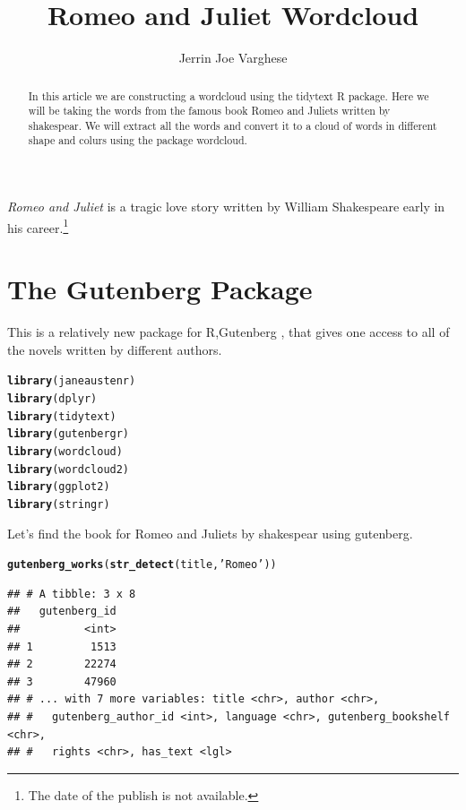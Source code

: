 \documentclass{article}\usepackage[]{graphicx}\usepackage[]{color}
\makeatletter
\newcommand{\hlstr}[1]{\textcolor[rgb]{0.192,0.494,0.8}{#1}}%
\newcommand{\hlstd}[1]{\textcolor[rgb]{0.345,0.345,0.345}{#1}}%
\newcommand{\hlkwd}[1]{\textcolor[rgb]{0.737,0.353,0.396}{\textbf{#1}}}%
\newenvironment{kframe}{%
 \def\at@end@of@kframe{}%
 \ifinner\ifhmode%
  \def\at@end@of@kframe{\end{minipage}}%
  \begin{minipage}{\columnwidth}%
 \fi\fi%
 \def\FrameCommand##1{\hskip\@totalleftmargin \hskip-\fboxsep
 \colorbox{shadecolor}{##1}\hskip-\fboxsep
     \hskip-\linewidth \hskip-\@totalleftmargin \hskip\columnwidth}%
 \MakeFramed {\advance\hsize-\width
   \@totalleftmargin\z@ \linewidth\hsize
   \@setminipage}}%
 {\par\unskip\endMakeFramed%
 \at@end@of@kframe}
\newenvironment{knitrout}{}{} %
\makeatother
\begin{document}
\title {Romeo and Juliet Wordcloud}
\author {Jerrin Joe Varghese}
\maketitle


\begin{abstract}
In this article we are constructing a wordcloud using the tidytext R package.
Here we will be taking the words from the famous book Romeo and Juliets written by shakespear.
We will extract all the words and convert it to a cloud of words in different shape and colurs using the package wordcloud.
\end{abstract}

\textit{Romeo and Juliet} is a tragic love story written by  William Shakespeare early \noindent in his career.\footnote{The date of the publish is not available.}

\section {The Gutenberg Package}
This is a relatively new package for R,Gutenberg , that gives one access to all of the novels written by different authors.

\begin{knitrout}
\color{fgcolor}\begin{kframe}
\begin{alltt}
\hlkwd{library}\hlstd{(janeaustenr)}
\hlkwd{library}\hlstd{(dplyr)}
\hlkwd{library}\hlstd{(tidytext)}
\hlkwd{library}\hlstd{(gutenbergr)}
\hlkwd{library}\hlstd{(wordcloud)}
\hlkwd{library}\hlstd{(wordcloud2)}
\hlkwd{library}\hlstd{(ggplot2)}
\hlkwd{library}\hlstd{(stringr)}
\end{alltt}
\end{kframe}
\end{knitrout}


Let's find the book for Romeo and Juliets by shakespear using gutenberg.

\begin{knitrout}
\color{fgcolor}\begin{kframe}
\begin{alltt}
\hlkwd{gutenberg_works}\hlstd{(}\hlkwd{str_detect}\hlstd{(title,}\hlstr{'Romeo'}\hlstd{))}
\end{alltt}
\begin{verbatim}
## # A tibble: 3 x 8
##   gutenberg_id
##          <int>
## 1         1513
## 2        22274
## 3        47960
## # ... with 7 more variables: title <chr>, author <chr>,
## #   gutenberg_author_id <int>, language <chr>, gutenberg_bookshelf <chr>,
## #   rights <chr>, has_text <lgl>
\end{verbatim}
\end{kframe}
\end{knitrout}
\end{document}
